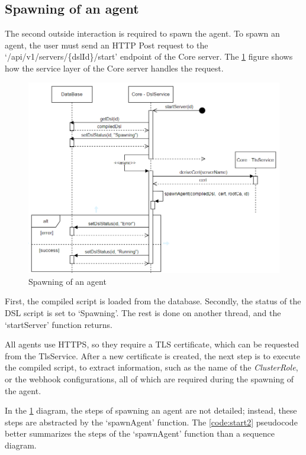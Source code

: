 \subsection{Spawning of an agent}
\label{sec:spawning}

The second outside interaction is required to spawn the agent. To spawn an agent, the user must send an HTTP Post request to the `/api/v1/servers/\{dslId\}/start' endpoint of the Core server. The \ref{fig:start1} figure shows how the service layer of the Core server handles the request.

\begin{figure}[h]
    \centering
    \includegraphics[width=130mm, keepaspectratio]{seq5.png}
    \caption{Spawning of an agent}
    \label{fig:start1}
\end{figure}

First, the compiled script is loaded from the database. Secondly, the status of the DSL script is set to `Spawning'. The rest is done on another thread, and the `startServer' function returns.

All agents use HTTPS, so they require a TLS certificate, which can be requested from the TlsService.
After a new certificate is created, the next step is to execute the compiled script, to extract information, such as the name of the \emph{ClusterRole}, or the webhook configurations, all of which are required during the spawning of the agent.

In the \ref{fig:start1} diagram, the steps of spawning an agent are not detailed; instead, these steps are abstracted by the `spawnAgent' function. The \ref{code:start2} pseudocode better summarizes the steps of the `spawnAgent' function than a sequence diagram.

